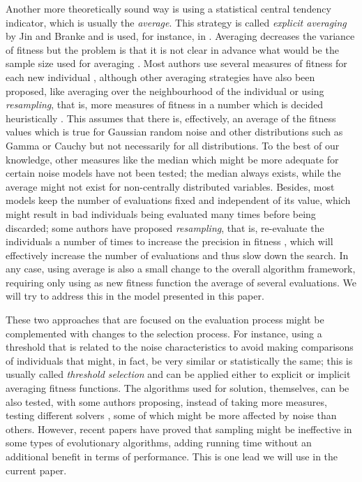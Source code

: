 \documentclass{llncs}
\begin{document}
Another more theoretically sound way is using a statistical central tendency
indicator, which is usually the {\em average}. This strategy is called
{\em explicit averaging} by Jin and Branke and is used, for instance,
in 
\cite{Junhua20136780}. Averaging decreases the variance of fitness but
the problem is that it is not clear in advance what would be the
sample size used for averaging \cite{aizawa1994scheduling}. Most
authors use several measures of fitness for each new individual
\cite{costa2013using}, although other averaging strategies have also
been proposed, like averaging over the neighbourhood of the
individual or using {\em resampling}, that is, more measures of fitness in a
number which is decided heuristically
\cite{liu2014mathematically}. This assumes that there is, effectively,
an average of the 
fitness values which is true for Gaussian random noise and other
distributions such as Gamma or Cauchy but not
necessarily for all distributions. 
To the best of our knowledge, 
other measures like the median which might be more adequate for
certain noise models have not been tested; the median always exists,
while the average might not exist for non-centrally distributed
variables. Besides, most models keep the number of evaluations fixed 
and independent of its value, 
which might result in bad individuals
being evaluated many times before being discarded; some authors have
proposed {\em resampling}, that is, re-evaluate the individuals a number of times to increase the precision in fitness
\cite{RadaVilela2014,6900521}, 
which will effectively increase the number of
evaluations and thus slow down the search. In any case, using average is
also a small change to the overall algorithm framework, requiring only
using as new fitness function the average of several evaluations.
We will try to address this in the model presented in this
paper. 

These two approaches that are focused on the evaluation process might
be complemented with changes to the selection process. For instance,
using a threshold \cite{Rudolph2001318,6900521} that is related to the noise characteristics to
avoid making comparisons of individuals that might, in fact, be very
similar or statistically the same; this is usually called {\em
  threshold selection} and can be applied either to explicit or
implicit averaging fitness functions. The algorithms used for
solution, themselves, can be also tested, with some authors proposing, instead of taking more measures, 
testing different solvers \cite{cauwet2014algorithm}, some of which
might be more affected by noise than others. However, recent papers
have proved that sampling might be ineffective \cite{Qian:sampling} in
some types of evolutionary algorithms, adding running time without an
additional benefit in terms of performance. This is one lead we will
use in the current paper. 
\end{document}
